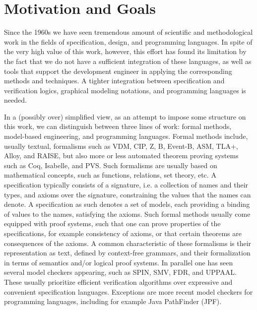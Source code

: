 
\section{Motivation and Goals}
\label{sec:introduction}

Since the 1960s we have seen tremendous amount of scientific and 
methodological work in the fields of specification, design, and 
programming languages. In spite of the very high value of this work, however, this effort has found its limitation by the fact that we do not have a sufficient integration of these languages, as well as tools that support the development engineer in applying the corresponding methods and techniques. A tighter integration between specification and verification logics, graphical modeling notations, and programming languages is needed.

In a (possibly over) simplified view, as an attempt to impose some 
structure on this work, we can distinguish between three lines of 
work: formal methods, model-based engineering, and 
programming languages. Formal methods include, usually textual, 
formalisms such as VDM, CIP, Z, B, Event-B, ASM, TLA+, Alloy, and RAISE, but also more or less 
automated theorem proving systems such as Coq, Isabelle, and 
PVS. Such formalisms are usually based on mathematical 
concepts, such as functions, relations, set theory, etc. A 
specification typically 
consists of a signature, i.e. a collection of names and their types, and 
axioms over  the signature, constraining the values that 
the names can denote. A specification as such denotes a set of 
models, each providing a binding of values to the names, satisfying 
the axioms. Such formal methods usually come equipped with proof 
systems, such that one can prove properties of the specifications, 
for example consistency of axioms, or that certain theorems are 
consequences of the axioms. A common characteristic of 
these formalisms is their representation as text, defined by context-free grammars, and their formalization in terms of semantics and/or logical proof systems. 
%
In parallel one has seen several model checkers appearing, such as
SPIN, SMV, FDR, and UPPAAL. These usually prioritize efficient verification algorithms over expressive and convenient 
specification languages. Exceptions are more recent model checkers for programming languages, including for example Java PathFinder (JPF).

